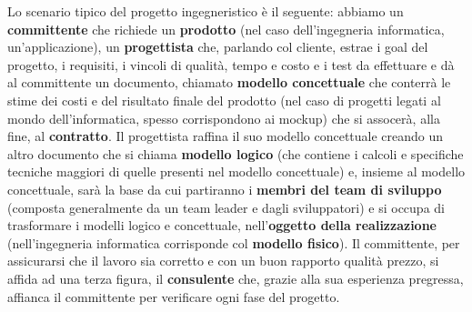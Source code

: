 Lo scenario tipico del progetto ingegneristico è il seguente: abbiamo un \textbf{committente} che richiede un \textbf{prodotto} (nel caso dell’ingegneria informatica, un’applicazione), un \textbf{progettista} che, parlando col cliente, estrae i goal del progetto, i requisiti, i vincoli di qualità, tempo e costo e i test da effettuare e dà al committente un documento, chiamato \textbf{modello concettuale} che conterrà le stime dei costi e del risultato finale del prodotto (nel caso di progetti legati al mondo dell’informatica, spesso corrispondono ai mockup) che si assocerà, alla fine, al \textbf{contratto}. Il progettista raffina il suo modello concettuale creando un altro documento che si chiama \textbf{modello logico} (che contiene i calcoli e specifiche tecniche maggiori di quelle presenti nel modello concettuale) e, insieme al modello concettuale, sarà la base da cui partiranno i \textbf{membri del team di sviluppo} (composta generalmente da un team leader e dagli sviluppatori) e si occupa di trasformare i modelli logico e concettuale, nell’\textbf{oggetto della realizzazione} (nell’ingegneria informatica corrisponde col \textbf{modello fisico}). Il committente, per assicurarsi che il lavoro sia corretto e con un buon rapporto qualità prezzo, si affida ad una terza figura, il \textbf{consulente} che, grazie alla sua esperienza pregressa, affianca il committente per verificare ogni fase del progetto.   
